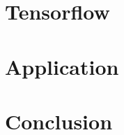 \documentclass[ a4paper, 12pt, oneside, onecolumn, final, openany ]{report}
\begin{document}
    \chapter{Tensorflow}
    

    \chapter{Application}
    

    \chapter{Conclusion}
    

    \newpage

    
    
\end{document}
